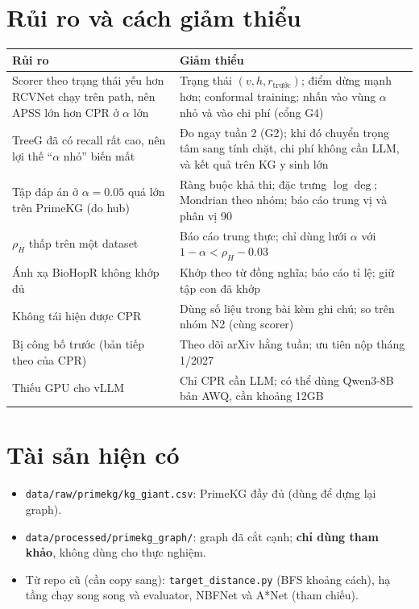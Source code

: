 \documentclass[11pt,a4paper]{article}
\theoremstyle{remark}
\begin{document}
\section{Rủi ro và cách giảm thiểu}
\begin{center}
\small
\begin{tabularx}{\linewidth}{>{\raggedright\arraybackslash}p{4.6cm} >{\raggedright\arraybackslash}X}
\toprule
Rủi ro & Giảm thiểu \\
\midrule
Scorer theo trạng thái yếu hơn RCVNet chạy trên path, nên APSS lớn hơn CPR ở $\alpha$ lớn & Trạng thái $(v,h,r_{\text{trước}})$; điểm dừng mạnh hơn; conformal training; nhấn vào vùng $\alpha$ nhỏ và vào chi phí (cổng G4) \\
TreeG đã có recall rất cao, nên lợi thế ``$\alpha$ nhỏ'' biến mất & Đo ngay tuần 2 (G2); khi đó chuyển trọng tâm sang tính chặt, chi phí không cần LLM, và kết quả trên KG y sinh lớn \\
Tập đáp án ở $\alpha=0.05$ quá lớn trên PrimeKG (do hub) & Ràng buộc khả thi; đặc trưng $\log\deg$; Mondrian theo nhóm; báo cáo trung vị và phân vị 90 \\
$\rho_H$ thấp trên một dataset & Báo cáo trung thực; chỉ dùng lưới $\alpha$ với $1-\alpha<\rho_H-0.03$ \\
Ánh xạ BioHopR không khớp đủ & Khớp theo từ đồng nghĩa; báo cáo tỉ lệ; giữ tập con đã khớp \\
Không tái hiện được CPR & Dùng số liệu trong bài kèm ghi chú; so trên nhóm N2 (cùng scorer) \\
Bị công bố trước (bản tiếp theo của CPR) & Theo dõi arXiv hằng tuần; ưu tiên nộp tháng 1/2027 \\
Thiếu GPU cho vLLM & Chỉ CPR cần LLM; có thể dùng Qwen3-8B bản AWQ, cần khoảng 12GB \\
\bottomrule
\end{tabularx}
\end{center}

\section{Tài sản hiện có}
\begin{itemize}[nosep]
  \item \texttt{data/raw/primekg/kg\_giant.csv}: PrimeKG đầy đủ (dùng để dựng lại graph).
  \item \texttt{data/processed/primekg\_graph/}: graph đã cắt cạnh; \textbf{chỉ dùng tham khảo}, không dùng cho thực nghiệm.
  \item Từ repo cũ (cần copy sang): \texttt{target\_distance.py} (BFS khoảng cách), hạ tầng chạy song song và evaluator, NBFNet và A*Net (tham chiếu).
\end{itemize}
\end{document}
